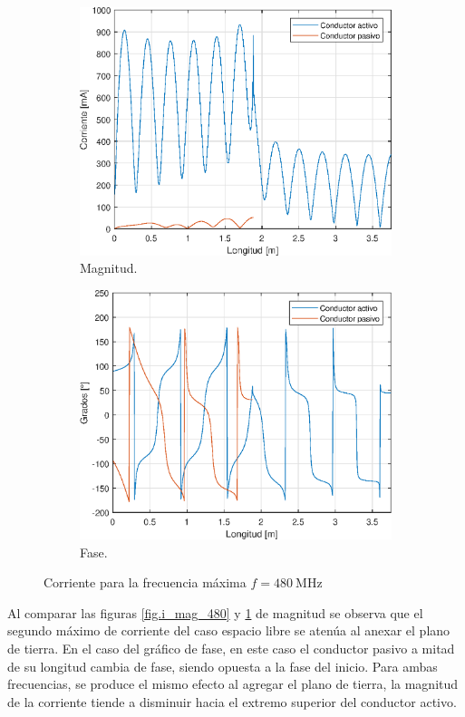 \begin{figure}[H]
\begin{subfigure}{0.5\textwidth}
		\includegraphics[scale=0.6]{imagenes/i_mag_480_tierra.eps}
		\caption{Magnitud.}
		\label{fig.i_mag_480_tierra}
	\end{subfigure}
	\quad
	\begin{subfigure}{0.5\textwidth}
		\includegraphics[scale=0.6]{imagenes/i_fase_480_tierra.eps}
		\caption{Fase.}
		\label{fig.i_fase_480_tierra}
	\end{subfigure}
	\caption{Corriente para la frecuencia máxima $f = \SI{480}{\mega\hertz}$}
\end{figure}

Al comparar las figuras \ref{fig.i_mag_480} y \ref{fig.i_mag_480_tierra} de magnitud se observa que el segundo máximo de corriente del caso espacio libre se atenúa al anexar el plano de tierra. En el caso del gráfico de fase, en este caso el conductor pasivo a mitad de su longitud cambia de fase, siendo opuesta a la fase del inicio.
Para ambas frecuencias, se produce el mismo efecto al agregar el plano de tierra, la magnitud de la corriente tiende a disminuir hacia el extremo superior del conductor activo.
